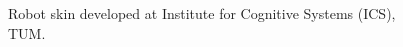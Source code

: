 \begin{figure}[h]
\centering
{}
\caption[]{Robot skin developed at Institute for Cognitive Systems (ICS), TUM.}
\label{fig:RobotSkin}
\vspace{-10pt}
\end{figure}	

